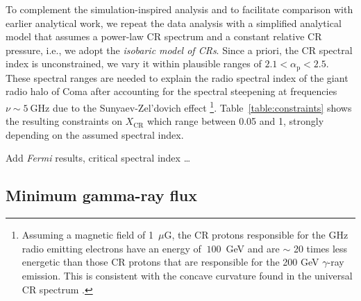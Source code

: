 \documentclass[12pt,manuscript]{aastex}
\def\del#1{{}}
\newcommand{\rmn}{\mathrm}
\newcommand{\CR}{\mathrm{CR}}
\begin{document}
To complement the simulation-inspired analysis and to facilitate comparison with
earlier analytical work, we repeat the data analysis with a simplified
analytical model that assumes a power-law CR spectrum and a constant relative CR
pressure, i.e., we adopt the {\em isobaric model of CRs}. Since a priori, the CR
spectral index is unconstrained, we vary it within plausible ranges of
$2.1<\alpha_\rmn{p}<2.5$. These spectral ranges are needed to explain the radio
spectral index of the giant radio halo of Coma after accounting for the spectral
steepening at frequencies $\nu\sim5~\rmn{GHz}$ due to the Sunyaev-Zel'dovich
effect \citep{2004A&A...413...17P}\footnote[4]{Assuming a magnetic field of
  1~$\mu$G, the CR protons responsible for the GHz radio emitting electrons have
  an energy of $~100$~GeV and are $\sim$ 20 times less energetic than those CR
  protons that are responsible for the 200 GeV $\gamma$-ray emission. This is
  consistent with the concave curvature found in the universal CR spectrum
  \citet{2010MNRAS.409..449P}.}.  Table~\ref{table:constraints} shows the
resulting constraints on $X_\CR$ which range between 0.05 and 1, strongly
depending on the assumed spectral index.

Add {\em Fermi} results, critical spectral index \ldots


\del{
the limit for 0.2 deg and alpha_p = 2.3 is compatible with the simulation based
one, X_CR < 0.1. However, there is currently a discrepancy in our assumptions
about the lower energy cutoff of CRs: in the simulations we use P/mp c = 0.8 (as
simulated) while I set this to 0 in my simplified (isobaric) model. The
discrepancy can be understood as follows:
*) in the isobaric model, we would have to normalize our $X_\CR$ by a factor of 2/3
for an effective spectral index of ~ 2.4 (between GeV and 200 GeV) as inferred
from the simulations (see Fig 1, CP & Ensslin 2004, A&A, 413, 17).
*) In the simulation model, we have an increased pressure by this factor of 3/2
(in comparison to a power law spectrum with alpha_TeV ~ 2.3 down to a cutoff in
the normalized momentum of 0.8) due to the concave curvature of our spectrum.
}

\subsection{Minimum gamma-ray flux}
\end{document}
